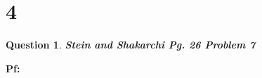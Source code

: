 \documentclass{article}
\newtheorem{question}{Question}
\begin{document}
\begin{comment}
$$\frac{\partial v_1}{\partial x}=\frac{\partial}{\partial x}(-v(x,y_1)) = -\left(\frac{\partial v}{\partial x}\frac{\partial x}{\partial x}+\frac{\partial v}{\partial y_1}\frac{\partial y_1}{\partial x}\right) = -\left(\frac{\partial v}{\partial x}\cdot 1+\frac{\partial v}{\partial y_1}\cdot 0\right) = -\frac{\partial v}{\partial x}$$
$$\frac{\partial v_1}{\partial y}=\frac{\partial}{\partial y}(-v(x,y_1)) = -\left(\frac{\partial v}{\partial x}\frac{\partial x}{\partial y}+\frac{\partial v}{\partial y_1}\frac{\partial y_1}{\partial y}\right) = -\left(\frac{\partial v}{\partial x}\cdot 0+\frac{\partial v}{\partial y_1}\cdot (-1)\right) = \frac{\partial v}{\partial y_1}$$


\break


\break

\end{comment}


\section*{4}
\begin{question}
    \textbf{Stein and Shakarchi Pg. 26 Problem 7}
\end{question}

\textbf{Pf:}
\end{document}
